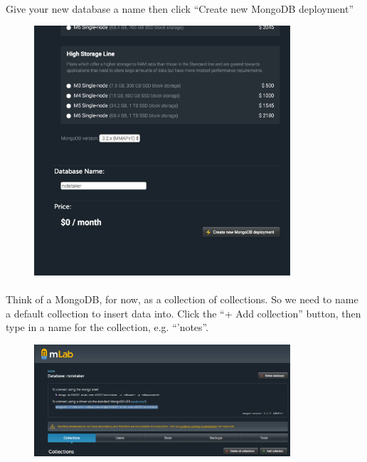 \documentclass[10pt, a4paper, twosize]{article}
\begin{document}
\paragraph{} Give your new database a name then click ``Create new MongoDB deployment''

\begin{figure}[H]
\centering
\includegraphics[width=0.85\textwidth]{images/mlab_dbname}
\caption{}
\label{fig:}
\end{figure}

\paragraph{} Think of a MongoDB, for now, as a collection of collections. So we need to name a default collection to insert data into. Click the ``+ Add collection'' button, then type in a name for the collection, e.g. ``'notes''.

\begin{figure}[H]
\centering
\includegraphics[width=0.85\textwidth]{images/mlab_mongocollection}
\caption{}
\label{fig:}
\end{figure}
\end{document}
